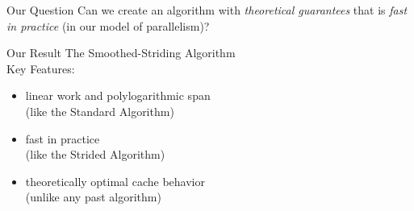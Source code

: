 \documentclass[xcolor=x11names, svgnames, rgb]{beamer}
\begin{document}
\begin{frame}[t]{Our Question}
	\vspace{1cm}
	{\Large Can we create an algorithm with \emph{theoretical
  guarantees} that is \emph{fast in practice} (in our model of
parallelism)?}
\end{frame}

\begin{frame}[t]{Our Result}
	\vspace{0.15cm}
	{\Large The Smoothed-Striding Algorithm\\}
	\vspace{0.5cm}
	Key Features:
	\begin{itemize}
		\item linear work and polylogarithmic span \\
			{\color{blue} (like the Standard Algorithm)\\}
		\vspace{0.15cm}
		\item fast in practice \\
			{\color{blue} (like the Strided Algorithm)\\}
	\vspace{0.15cm}
		\item theoretically optimal cache behavior \\
			{\color{blue} (unlike any past algorithm)}
	\end{itemize}
\end{frame}
\end{document}
